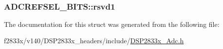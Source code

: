 \subsubsection[{rsvd1}]{ A\+D\+C\+R\+E\+F\+S\+E\+L\+\_\+\+B\+I\+T\+S\+::rsvd1}\label{struct_a_d_c_r_e_f_s_e_l___b_i_t_s_a296e6350a08d63842a95c92753093e82}


The documentation for this struct was generated from the following file\+:\begin{DoxyCompactItemize}
\item 
f2833x/v140/\+D\+S\+P2833x\+\_\+headers/include/\hyperlink{_d_s_p2833x___adc_8h}{D\+S\+P2833x\+\_\+\+Adc.\+h}\end{DoxyCompactItemize}
